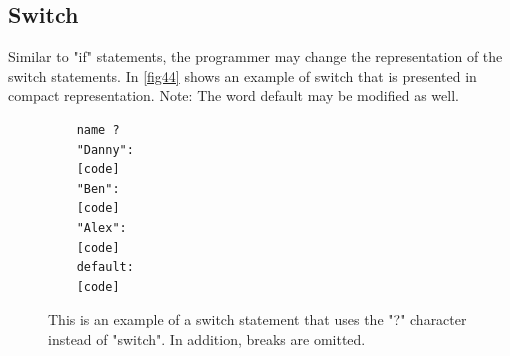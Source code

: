 \subsection{Switch}
Similar to "if" statements, the programmer may change the representation of the switch statements. In \autoref{fig44} shows an example of switch that is presented in compact representation. Note: The word default may be modified as well.
\begin{figure}[H]
	\begin{lstlisting}
	name ?
	"Danny": 
	[code]
	"Ben": 
	[code]
	"Alex": 
	[code]
	default: 
	[code]
	\end{lstlisting}
	\caption{This is an example of a switch statement that uses the "?" character instead of "switch". In addition, breaks are omitted.}
	\label{fig44}
\end{figure}
